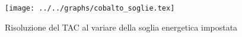\begin{figure}[h] \centering\texttt{[image: ../../graphs/cobalto\_soglie.tex]}\caption{Risoluzione del TAC al variare della soglia energetica impostata }\label{gr:cobalto_soglie} \end{figure}
